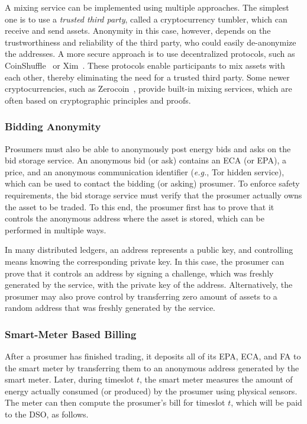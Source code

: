 A mixing service can be implemented using multiple approaches.  The
simplest one is to use a \emph{trusted third party}, called a
cryptocurrency tumbler, which can receive and send assets. Anonymity
in this case, however, depends on the trustworthiness and reliability
of the third party, who could easily de-anonymize the addresses.  A
more secure approach is to use decentralized protocols, such as
CoinShuffle~\cite{ruffing2014coinshuffle} or
Xim~\cite{bissias2014sybil}.  These protocols enable participants to
mix assets with each other, thereby eliminating the need for a trusted
third party.  Some newer cryptocurrencies, such as
Zerocoin~\cite{miers2013zerocoin}, provide built-in mixing services,
which are often based on cryptographic principles and proofs.

\subsubsection{Bidding Anonymity}
Prosumers must also be able to anonymously post energy bids and asks
on the bid storage service.  An anonymous bid (or ask) contains an ECA
(or EPA), a price, and an anonymous communication identifier
(\emph{e.g.}, Tor hidden service), which can be used to contact the
bidding (or asking) prosumer.  To enforce safety requirements, the bid
storage service must verify that the prosumer actually owns the asset
to be traded.  To this end, the prosumer first has to prove that it
controls the anonymous address where the asset is stored, which can be
performed in multiple ways.

In many distributed ledgers, an address represents a public key, and
controlling means knowing the corresponding private key.  In this
case, the prosumer can prove that it controls an address by signing a
challenge, which was freshly generated by the service, with the
private key of the address.  Alternatively, the prosumer may also
prove control by transferring zero amount of assets to a random
address that was freshly generated by the service.

\subsubsection{Smart-Meter Based Billing}
After a prosumer has finished trading, it deposits all of its EPA,
ECA, and FA to the smart meter by transferring them to an anonymous
address generated by the smart meter.  Later, during timeslot $t$, the
smart meter measures the amount of energy actually consumed (or
produced) by the prosumer using physical sensors.  The meter can then
compute the prosumer's bill for timeslot $t$, which will be paid to
the DSO, as follows. 

